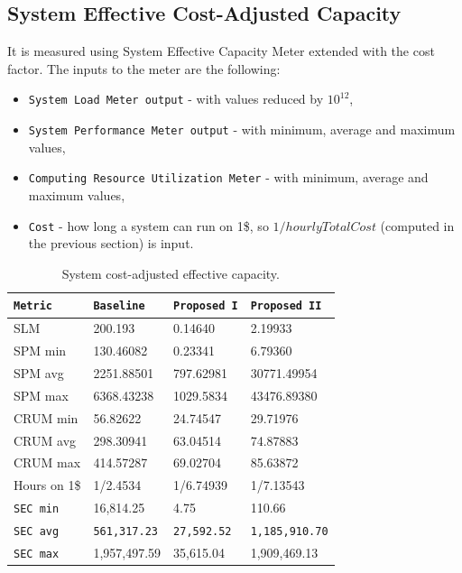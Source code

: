 \documentclass{uvamscse}
\begin{document}
\subsection{System Effective Cost-Adjusted Capacity}
It is measured using System Effective Capacity Meter extended with the cost factor. The inputs to the meter are the following:
\begin{itemize}
  \item \texttt{System Load Meter output} - with values reduced by $10^{12}$,
  \item \texttt{System Performance Meter output} - with minimum, average and maximum values,
  \item \texttt{Computing Resource Utilization Meter} - with minimum, average and maximum values,
  \item \texttt{Cost} - how long a system can run on 1\$, so $1/hourlyTotalCost$ (computed in the previous section) is input.
\end{itemize}

\begin{table}[H]
\begin{center}
\begin{tabular}{llll}
  \texttt{Metric}               & \texttt{Baseline}   & \texttt{Proposed I}  & \texttt{Proposed II}  \\
  \hline
  SLM                           & 200.193             & 0.14640              & 2.19933         \\
  \hline
  SPM min                       & 130.46082           & 0.23341              & 6.79360                 \\
  SPM avg                       & 2251.88501          & 797.62981            & 30771.49954                 \\
  SPM max                       & 6368.43238          & 1029.5834            & 43476.89380                 \\
  \hline
  CRUM min                      & 56.82622            & 24.74547             & 29.71976                \\
  CRUM avg                      & 298.30941           & 63.04514             & 74.87883                 \\
  CRUM max                      & 414.57287           & 69.02704             & 85.63872                 \\
  \hline
  Hours on 1\$                 & 1/2.4534             & 1/6.74939            & 1/7.13543                \\
  \hline
  \texttt{SEC min}              & 16,814.25           & 4.75                 & 110.66         \\
  \texttt{SEC avg}              & \texttt{561,317.23} & \texttt{27,592.52}   & \texttt{1,185,910.70}         \\
  \texttt{SEC max}              & 1,957,497.59        & 35,615.04            & 1,909,469.13         \\
\end{tabular}
\end{center}
\caption{System cost-adjusted effective capacity.}
\label{table:sec}
\end{table}
\end{document}
